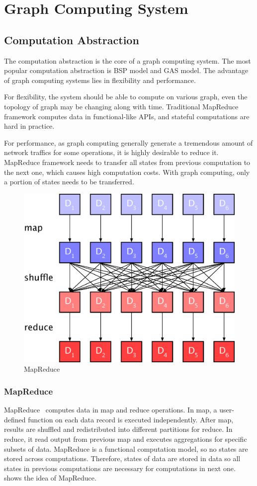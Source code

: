 \section{Graph Computing System} \label{component}
\subsection{Computation Abstraction}
The computation abstraction is the core of a graph computing system. The
most popular computation abstraction is BSP model and GAS model.
The advantage of graph computing systems lies in flexibility and performance.

For flexibility, the system should be able to compute on various
graph, even the topology of graph may be changing along with time.
Traditional MapReduce framework computes data in functional-like
APIs, and stateful computations are hard in practice.

For performance, as graph computing generally generate a tremendous
amount of network traffics for some operations,
it is highly desirable to reduce it. MapReduce framework needs to transfer
all states from previous computation to the next one, which causes high computation
costs. With graph computing, only a portion of states needs to be transferred.

\begin{figure}[tbh]
  \center
  \includegraphics[width=.8\linewidth]{figures/mrmodel}
  \caption{MapReduce}
  \label{fig:mrmodel}
\end{figure}
\subsubsection{MapReduce}
MapReduce~\cite{mapreduce} computes data in map and reduce operations.
In map, a user-defined function on each data record is executed independently.
After map, results are shuffled and redistributed into different partitions
for reduce. In reduce, it read output from previous map and executes
aggregations for specific subsets of data. MapReduce is a functional
computation model, so no states are stored across computations.
Therefore, states of data are stored in data so all states
in previous computations are necessary
for computations in next one.  shows the idea of MapReduce.

